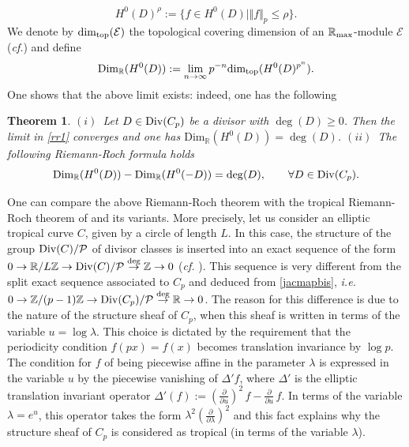 \documentclass{elsart3-1}
\newtheorem{theorem}{Theorem}[section]
\def\R{{\mathbb R}}
\def\Z{{\mathbb Z}}
\def\cdim{{{\mbox{Dim}_\R}}}
\def\tdim{{{\mbox{dim}_{\rm top}}}}
\def\cE{{\mathcal E}}
\def\cP{{\mathcal P}}
\newcommand{\ie}{{\it i.e.\/}\ }
\newcommand{\cf}{{\it cf.}}
\def\rma{\R_{\rm max}}
\def\div{{\rm Div}}
\def\vsp{\vspace{.05in}}
\begin{document}
\begin{equation*}%
H^0(D)^\rho:=\{f\in H^0(D)\mid \Vert f\Vert_p\leq \rho\}.
\end{equation*}
\vsp
We denote by $\tdim(\cE)$ the topological covering dimension   of an $\rma$-module $\cE$ (\cf \cite{Pears}) and define
\begin{equation}\label{rr1}
\cdim(H^0(D)):=\lim_{n\to \infty} p^{-n}\tdim(H^0(D)^{p^n}).
\end{equation}
One shows that the above limit exists: indeed, one has the following
\vsp
\begin{theorem}\label{RRperiodic}
$(i)$~Let $D\in \div(C_p)$ be a divisor with $\deg(D)\geq 0$. Then the limit in \eqref{rr1} converges and one has  
$\cdim(H^0(D))=\deg(D)$.\newline
$(ii)$~The following Riemann-Roch formula holds
\begin{equation*}%
\cdim(H^0(D))-\cdim(H^0(-D))=\deg(D),\qquad \forall D\in \div(C_p).
\end{equation*}	
\end{theorem}
\vsp
One can compare the above Riemann-Roch theorem with the tropical Riemann-Roch theorem of \cite{BN,GK,MZ} and its variants. More precisely, let us consider an elliptic tropical curve $C$, given by a circle of length $L$. In this case, the structure of the group $\div(C)/\cP$ of divisor classes is inserted into an exact sequence of the  form
$
0\to \R/L\Z\to \div(C)/\cP\stackrel{\deg}{\to} \Z\to 0
$ (\cf  \cite{MZ}\!\! ).
This sequence is very different from the split exact sequence associated to $C_p$ and
deduced from \eqref{jacmapbis}, \ie 
$
0\to \Z/(p-1)\Z\to \div(C_p)/\cP\stackrel{\deg}{\to} \R\to 0
$.
The reason for this difference is due to the nature of the structure sheaf of $C_p$, when this sheaf is written in terms of the variable $u=\log\lambda$. This choice is dictated by the requirement that the periodicity condition $f(px)=f(x)$ becomes translation invariance by $\log p$. The condition for $f$ of being piecewise affine in the parameter $\lambda$  is expressed in the variable $u$ by the piecewise vanishing of $\Delta'f$, where $\Delta'$ is the elliptic translation invariant operator 
$
\Delta'(f):=\left(\frac{\partial}{\partial u}\right)^2\, f - \frac{\partial}{\partial u}\, f
$.
In terms of the variable $\lambda=e^u$, this operator takes the form $\lambda^2\left(\frac{\partial}{\partial \lambda}\right)^2$ and this fact explains why the structure sheaf of $C_p$ is considered as tropical (in terms of the variable $\lambda$).
\end{document}
